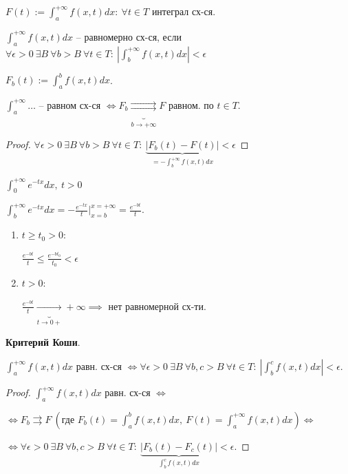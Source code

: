 
$F(t) := \int_{a}^{+\infty} { f(x, t) dx }: \ \forall t \in T$ интеграл сх-ся.

\begin{definition}
    $\int_{a}^{+\infty} { f(x, t) dx }$ -- равномерно сх-ся, если $\forall \epsilon > 0 \ \exists B \ \forall b > B \ \forall t \in T: \ | \int_{b}^{+\infty} { f(x, t) d x } | < \epsilon$
\end{definition}

\begin{remark}
    $F_b(t) := \int_{a}^{b} { f(x, t) dx }$.

    $\int_{a}^{+\infty} { \dots }$ -- равном сх-ся $\Leftrightarrow F_b \underbrace{\rightrightarrows}_{b \rightarrow +\infty} F$ равном. по $t \in T$.
\end{remark}
\begin{proof}
    $\forall \epsilon > 0 \ \exists B \ \forall b > B \ \forall t \in T: \ \underbrace{| F_b(t) - F(t) |}_{= -\int_{b}^{+\infty} { f(x, t) d x }} < \epsilon$
\end{proof}

\begin{example}
    $\int_{0}^{+\infty} { e^{-tx} dx }, \ t > 0$

    $\int_{b}^{+\infty} { e^{-tx} dx } = -\frac{e^{-tx}}{t} |_{x=b}^{x=+\infty} = \frac{e^{-bt}}{t}$.

    \begin{enumerate}
        \item {
            $t \geq t_0 > 0:$

            $\frac{e^{-bt}}{t} \leq \frac{e^{-bt_0}}{t_0} < \epsilon$
        }
        \item {
            $t > 0:$

            $\frac{e^{-bt}}{t} \underbrace{\rightarrow}_{t \rightarrow 0+} +\infty \implies$ нет равномерной сх-ти.
        }
    \end{enumerate}
\end{example}

\begin{theorem}
    \textbf{Критерий Коши}.

    $\int_{a}^{+\infty} { f(x, t) dx }$ равн. сх-ся $\Leftrightarrow \forall \epsilon > 0 \ \exists B \ \forall b, c > B \ \forall t \in T: \ | \int_b^{c} { f(x, t) d x } | < \epsilon$.
\end{theorem}
\begin{proof}
    $ \int_{a}^{+\infty} { f(x, t) dx } $ равн. сх-ся $\Leftrightarrow$
    
    $\Leftrightarrow F_b \rightrightarrows F \ (\text{где } F_b(t) = \int_{a}^{b} {f(x, t) dx}, \ F(t) = \int_{a}^{+\infty} {f(x, t) dx}) \Leftrightarrow$ 
    
    $\Leftrightarrow \forall \epsilon > 0 \ \exists B \ \forall b, c > B \ \forall t \in T: \ \underbrace{| F_b(t) - F_c(t) |}_{\int_{b}^{c} { f(x, t) d x }} < \epsilon$.
\end{proof}

